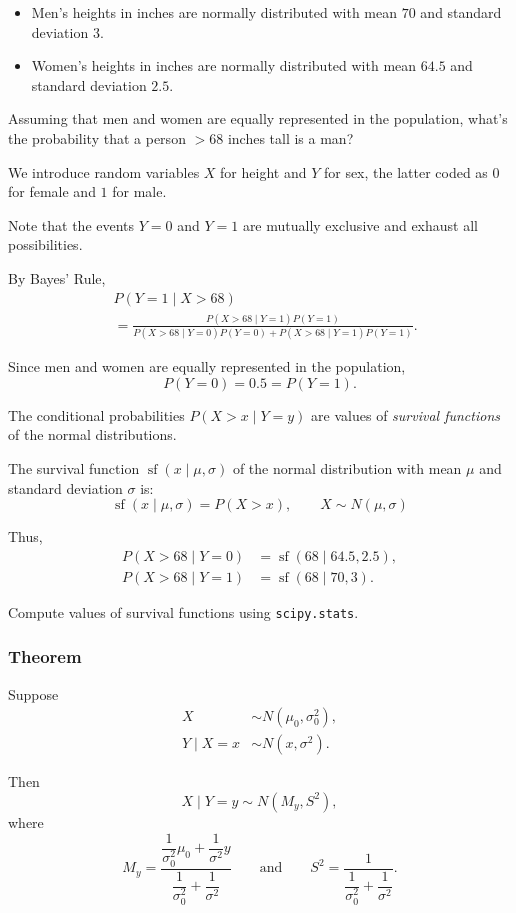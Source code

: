 \documentclass{beamer}
\DeclareMathOperator{\SF}{sf}
\begin{document}
\begin{frame}
\begin{itemize}
    \item Men's heights in inches are normally distributed with mean $70$
    and standard deviation $3$.
    \item Women's heights in inches are normally distributed with mean $64.5$
    and standard deviation $2.5$.
\end{itemize}    
Assuming that men and women are equally represented in the population,
what's the probability that a person $>68$ inches tall is a man?
\end{frame}

\begin{frame}
    \setlength\parskip{1em}
    We introduce random variables $X$ for height and $Y$ for sex,
    the latter coded as $0$ for female and $1$ for male.

    Note that the events $Y=0$ and $Y=1$ are mutually exclusive
    and exhaust all possibilities.

    By Bayes' Rule,
    \begin{align*}
    &P(Y=1\mid X>68)\\
    &=\frac{P(X>68\mid Y=1)P(Y=1)}
    {P(X>68\mid Y=0)P(Y=0) + P(X>68\mid Y=1)P(Y=1)}.
    \end{align*}

    Since men and women are equally represented in the population,
    \[
    P(Y=0) = 0.5 = P(Y=1).
    \]
\end{frame}

\begin{frame}
    \setlength\parskip{1em}
    The conditional probabilities $P(X>x\mid Y=y)$ are values of
    \emph{survival functions} of the normal distributions.

    The survival function $\SF(x\mid \mu,\sigma)$ of the
    normal distribution with mean $\mu$ and standard deviation $\sigma$ is:
    \[
    \SF(x\mid \mu, \sigma) = P(X>x),\qquad
    X\sim N(\mu, \sigma)
    \]

    Thus,
    \begin{align*}
    P(X>68\mid Y=0) &= \SF(68\mid 64.5, 2.5),\\
    P(X>68\mid Y=1) &= \SF(68\mid 70, 3).
    \end{align*}

    Compute values of survival functions using \texttt{scipy.stats}.
\end{frame}

\begin{frame}
    \frametitle{Theorem}
    Suppose
    \begin{align*}
    X&\sim N(\mu_0,\sigma_0^2),\\
    Y\mid X=x&\sim N(x, \sigma^2).
    \end{align*}

    Then
    \[
    X\mid Y=y\sim N(M_y, S^2),
    \]
    where
    \[
    M_y = \frac{\dfrac1{\sigma_0^2}\mu_0 + \dfrac1{\sigma^2}y}{\dfrac1{\sigma_0^2} + \dfrac1{\sigma^2}}
    \qquad\text{and}\qquad
    S^2 = \frac{1}{\dfrac1{\sigma_0^2} + \dfrac1{\sigma^2}}.
    \]
\end{frame}
\end{document}
